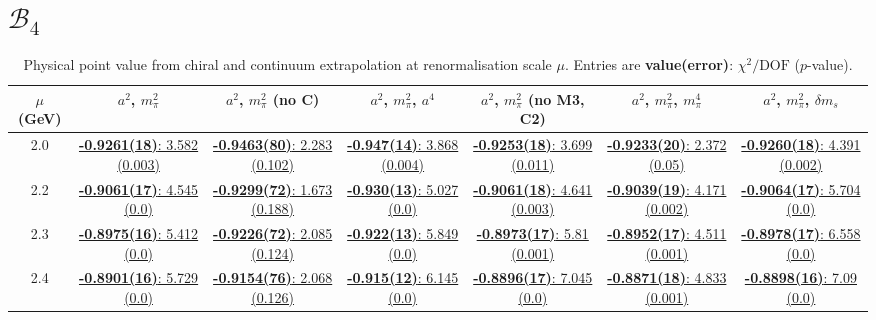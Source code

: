 \documentclass[12pt]{extarticle}
\begin{document}
\section{$\mathcal{B}_4$}
\begin{table}[h!]
\begin{center}
\begin{tabular}{|c|c|c|c|c|c|c|}
\hline
$\mu$ (GeV) & $a^2$, $m_\pi^2$& $a^2$, $m_\pi^2$ (no C)& $a^2$, $m_\pi^2$, $a^4$& $a^2$, $m_\pi^2$ (no M3, C2)& $a^2$, $m_\pi^2$, $m_\pi^4$& $a^2$, $m_\pi^2$, $\delta m_s$\\
\hline
2.0& \hyperlink{SSpPP/NPR/bag_a2m2_20.pdf.1}{\textbf{-0.9261(18)}: 3.582 (0.003)} & \hyperlink{SSpPP/NPR/bag_a2m2noC_20.pdf.1}{\textbf{-0.9463(80)}: 2.283 (0.102)} & \hyperlink{SSpPP/NPR/bag_a2a4m2_20.pdf.1}{\textbf{-0.947(14)}: 3.868 (0.004)} & \hyperlink{SSpPP/NPR/bag_a2m2mcut_20.pdf.1}{\textbf{-0.9253(18)}: 3.699 (0.011)} & \hyperlink{SSpPP/NPR/bag_a2m2m4_20.pdf.1}{\textbf{-0.9233(20)}: 2.372 (0.05)} & \hyperlink{SSpPP/NPR/bag_a2m2delm_20.pdf.1}{\textbf{-0.9260(18)}: 4.391 (0.002)}\\
2.2& \hyperlink{SSpPP/NPR/bag_a2m2_22.pdf.1}{\textbf{-0.9061(17)}: 4.545 (0.0)} & \hyperlink{SSpPP/NPR/bag_a2m2noC_22.pdf.1}{\textbf{-0.9299(72)}: 1.673 (0.188)} & \hyperlink{SSpPP/NPR/bag_a2a4m2_22.pdf.1}{\textbf{-0.930(13)}: 5.027 (0.0)} & \hyperlink{SSpPP/NPR/bag_a2m2mcut_22.pdf.1}{\textbf{-0.9061(18)}: 4.641 (0.003)} & \hyperlink{SSpPP/NPR/bag_a2m2m4_22.pdf.1}{\textbf{-0.9039(19)}: 4.171 (0.002)} & \hyperlink{SSpPP/NPR/bag_a2m2delm_22.pdf.1}{\textbf{-0.9064(17)}: 5.704 (0.0)}\\
2.3& \hyperlink{SSpPP/NPR/bag_a2m2_23.pdf.1}{\textbf{-0.8975(16)}: 5.412 (0.0)} & \hyperlink{SSpPP/NPR/bag_a2m2noC_23.pdf.1}{\textbf{-0.9226(72)}: 2.085 (0.124)} & \hyperlink{SSpPP/NPR/bag_a2a4m2_23.pdf.1}{\textbf{-0.922(13)}: 5.849 (0.0)} & \hyperlink{SSpPP/NPR/bag_a2m2mcut_23.pdf.1}{\textbf{-0.8973(17)}: 5.81 (0.001)} & \hyperlink{SSpPP/NPR/bag_a2m2m4_23.pdf.1}{\textbf{-0.8952(17)}: 4.511 (0.001)} & \hyperlink{SSpPP/NPR/bag_a2m2delm_23.pdf.1}{\textbf{-0.8978(17)}: 6.558 (0.0)}\\
2.4& \hyperlink{SSpPP/NPR/bag_a2m2_24.pdf.1}{\textbf{-0.8901(16)}: 5.729 (0.0)} & \hyperlink{SSpPP/NPR/bag_a2m2noC_24.pdf.1}{\textbf{-0.9154(76)}: 2.068 (0.126)} & \hyperlink{SSpPP/NPR/bag_a2a4m2_24.pdf.1}{\textbf{-0.915(12)}: 6.145 (0.0)} & \hyperlink{SSpPP/NPR/bag_a2m2mcut_24.pdf.1}{\textbf{-0.8896(17)}: 7.045 (0.0)} & \hyperlink{SSpPP/NPR/bag_a2m2m4_24.pdf.1}{\textbf{-0.8871(18)}: 4.833 (0.001)} & \hyperlink{SSpPP/NPR/bag_a2m2delm_24.pdf.1}{\textbf{-0.8898(16)}: 7.09 (0.0)}\\
\hline
\end{tabular}
\caption{Physical point value from chiral and continuum extrapolation at renormalisation scale $\mu$. Entries are \textbf{value(error)}: $\chi^2/\text{DOF}$ ($p$-value).}
\end{center}
\end{table}
\end{document}
